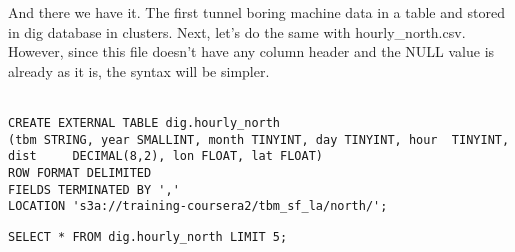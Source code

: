 \documentclass[a4paper,
							12pt,
							oneside,
							openright,
							DIV10,
							numbers=noendperiod
							]{scrreprt} %
\begin{document}
\noindent
And there we have it. The first tunnel boring machine data in a table and stored in dig database in clusters. Next, let's do the same with hourly\_north.csv. However, since this file doesn't have any column header and the NULL value is already as it is, the syntax will be simpler.\\
\\

\begin{lstlisting}
CREATE EXTERNAL TABLE dig.hourly_north 
(tbm STRING, year SMALLINT, month TINYINT, day TINYINT, hour  TINYINT, dist 	DECIMAL(8,2), lon FLOAT, lat FLOAT)
ROW FORMAT DELIMITED
FIELDS TERMINATED BY ','
LOCATION 's3a://training-coursera2/tbm_sf_la/north/';
\end{lstlisting}

\begin{lstlisting}
SELECT * FROM dig.hourly_north LIMIT 5;
\end{lstlisting}
\end{document}
